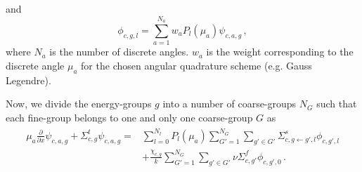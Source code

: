 \documentclass[5p,times,twocolumn,10pt]{elsarticle}
\begin{document}
    and
    \begin{equation}
        \phi_{c,g,l} = \sum_{a=1}^{N_a}w_a P_l(\mu_a)\psi_{c,a,g}\, ,
    \end{equation}
    where $N_a$ is the number of discrete angles.
    $w_a$ is the weight corresponding to the discrete angle $\mu_a$ for the chosen angular quadrature scheme (e.g. Gauss Legendre).

    Now, we divide the energy-groups $g$ into a number of coarse-groups $N_G$ such that each fine-group belongs to one and only one coarse-group $G$ as
    \begin{align}
        \begin{split}
            \mu_a\frac{\partial}{\partial x}\psi_{c,a,g}
            +\Sigma^t_{c,g}\psi_{c,a,g}
            =&\sum_{l=0}^{N_l}P_l(\mu_a)\sum_{G'=1}^{N_G}\sum_{g'\in G'}\Sigma^s_{c, g\leftarrow g', l}\phi_{c, g', l}\\
            &+\frac{\chi_{c,g}}{k}\sum_{G'=1}^{N_G}\sum_{g'\in G'}\nu\Sigma^f_{c,g'}\phi_{c,g',0}\, .
        \end{split}
    \end{align}
\end{document}
